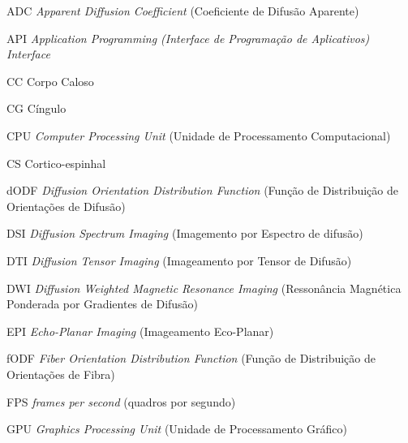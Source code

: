 \documentclass[
    12pt,                %
    oneside,            %
    a4paper,            %
    english,            %
    french,                %
    spanish,            %
    brazil                %
    ]{abntex2}
\begin{document}
\listoffigures*
\cleardoublepage

\listoftables*
\cleardoublepage

\begin{siglas}


\item[ADC] \textit{Apparent Diffusion Coefficient} (Coeficiente de Difusão Aparente)

\item[API] \textit{Application Programming (Interface de Programação de Aplicativos)
Interface}

\item[CC] Corpo Caloso

\item[CG] Cíngulo

\item [CPU] \textit{Computer Processing Unit} (Unidade de Processamento Computacional)

\item[CS] Cortico-espinhal


\item[dODF] \textit{Diffusion Orientation Distribution Function} (Função de Distribuição de Orientações de Difusão)

\item[DSI] \textit{Diffusion Spectrum Imaging} (Imagemento por Espectro de difusão)

\item[DTI] \textit{Diffusion Tensor Imaging} (Imageamento por Tensor de Difusão)

\item[DWI] \textit{Diffusion Weighted Magnetic Resonance Imaging} (Ressonância Magnética Ponderada por Gradientes de Difusão)

\item[EPI] \textit{Echo-Planar Imaging} (Imageamento Eco-Planar)

\item[fODF] \textit{Fiber Orientation Distribution Function} (Função de Distribuição de Orientações de Fibra)

\item[FPS] \textit{frames per second} (quadros por segundo)

\item [GPU] \textit{Graphics Processing Unit} (Unidade de Processamento Gráfico)


\end{siglas}
\end{document}
